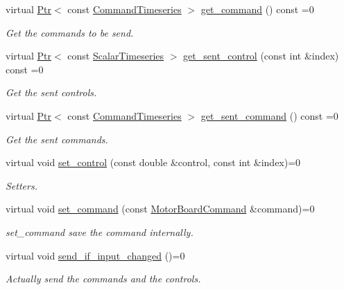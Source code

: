 \begin{DoxyCompactItemize}
virtual \hyperlink{classblmc__drivers_1_1MotorBoardInterface_a6a733b7ed7a3a96f6b0712b6bb5307f8}{Ptr}$<$ const \hyperlink{classblmc__drivers_1_1MotorBoardInterface_ae2afe94a023d9f08a4c689e9b7660f15}{Command\+Timeseries} $>$ \hyperlink{classblmc__drivers_1_1MotorBoardInterface_a4913308c1eacc98475aeb8647447c997}{get\+\_\+command} () const =0
\begin{DoxyCompactList}\small\item\em Get the commands to be send. \end{DoxyCompactList}\item 
virtual \hyperlink{classblmc__drivers_1_1MotorBoardInterface_a6a733b7ed7a3a96f6b0712b6bb5307f8}{Ptr}$<$ const \hyperlink{classblmc__drivers_1_1MotorBoardInterface_a14e237254ba495a66091ea3a3a33fa75}{Scalar\+Timeseries} $>$ \hyperlink{classblmc__drivers_1_1MotorBoardInterface_a8dc6222e915fc96d89b13cbb0fcb0cda}{get\+\_\+sent\+\_\+control} (const int \&index) const =0
\begin{DoxyCompactList}\small\item\em Get the sent controls. \end{DoxyCompactList}\item 
virtual \hyperlink{classblmc__drivers_1_1MotorBoardInterface_a6a733b7ed7a3a96f6b0712b6bb5307f8}{Ptr}$<$ const \hyperlink{classblmc__drivers_1_1MotorBoardInterface_ae2afe94a023d9f08a4c689e9b7660f15}{Command\+Timeseries} $>$ \hyperlink{classblmc__drivers_1_1MotorBoardInterface_afd3de58f7a900347154b8d323f1c1d94}{get\+\_\+sent\+\_\+command} () const =0
\begin{DoxyCompactList}\small\item\em Get the sent commands. \end{DoxyCompactList}\item 
virtual void \hyperlink{classblmc__drivers_1_1MotorBoardInterface_a3ace57ba3e09b9b3120d09303ff39a61}{set\+\_\+control} (const double \&control, const int \&index)=0
\begin{DoxyCompactList}\small\item\em Setters. \end{DoxyCompactList}\item 
virtual void \hyperlink{classblmc__drivers_1_1MotorBoardInterface_a86b4ff810ca652d6761090ceaff65621}{set\+\_\+command} (const \hyperlink{classblmc__drivers_1_1MotorBoardCommand}{Motor\+Board\+Command} \&command)=0
\begin{DoxyCompactList}\small\item\em set\+\_\+command save the command internally. \end{DoxyCompactList}\item 
\mbox{\label{classblmc__drivers_1_1MotorBoardInterface_a79afd172c736718868f4d269125f2581}} 
virtual void \hyperlink{classblmc__drivers_1_1MotorBoardInterface_a79afd172c736718868f4d269125f2581}{send\+\_\+if\+\_\+input\+\_\+changed} ()=0
\begin{DoxyCompactList}\small\item\em Actually send the commands and the controls. \end{DoxyCompactList}\end{DoxyCompactItemize}


